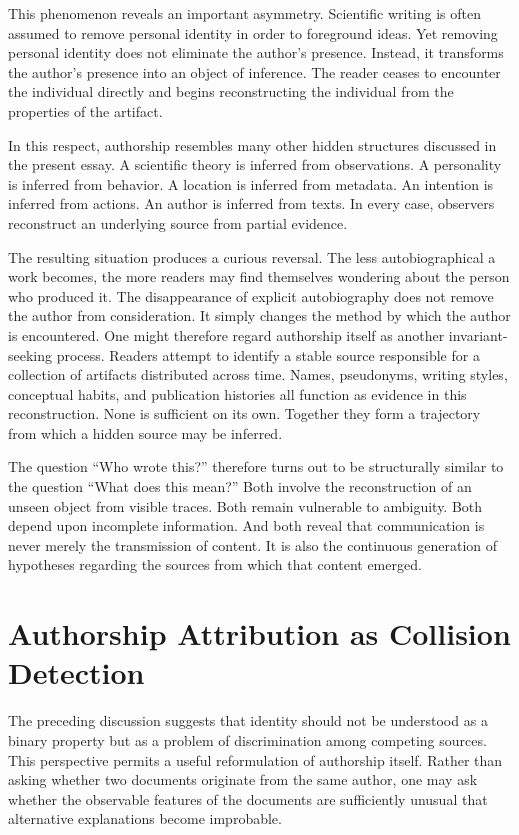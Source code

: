 \documentclass[11pt]{article}
\theoremstyle{plain}
\begin{document}
This phenomenon reveals an important asymmetry. Scientific writing is often assumed to remove personal identity in order to foreground ideas. Yet removing personal identity does not eliminate the author's presence. Instead, it transforms the author's presence into an object of inference. The reader ceases to encounter the individual directly and begins reconstructing the individual from the properties of the artifact.

In this respect, authorship resembles many other hidden structures discussed in the present essay. A scientific theory is inferred from observations. A personality is inferred from behavior. A location is inferred from metadata. An intention is inferred from actions. An author is inferred from texts. In every case, observers reconstruct an underlying source from partial evidence.

The resulting situation produces a curious reversal. The less autobiographical a work becomes, the more readers may find themselves wondering about the person who produced it. The disappearance of explicit autobiography does not remove the author from consideration. It simply changes the method by which the author is encountered. One might therefore regard authorship itself as another invariant-seeking process. Readers attempt to identify a stable source responsible for a collection of artifacts distributed across time. Names, pseudonyms, writing styles, conceptual habits, and publication histories all function as evidence in this reconstruction. None is sufficient on its own. Together they form a trajectory from which a hidden source may be inferred.

The question ``Who wrote this?'' therefore turns out to be structurally similar to the question ``What does this mean?'' Both involve the reconstruction of an unseen object from visible traces. Both remain vulnerable to ambiguity. Both depend upon incomplete information. And both reveal that communication is never merely the transmission of content. It is also the continuous generation of hypotheses regarding the sources from which that content emerged.

\section{Authorship Attribution as Collision Detection}

The preceding discussion suggests that identity should not be understood as a binary property but as a problem of discrimination among competing sources. This perspective permits a useful reformulation of authorship itself. Rather than asking whether two documents originate from the same author, one may ask whether the observable features of the documents are sufficiently unusual that alternative explanations become improbable.
\end{document}
